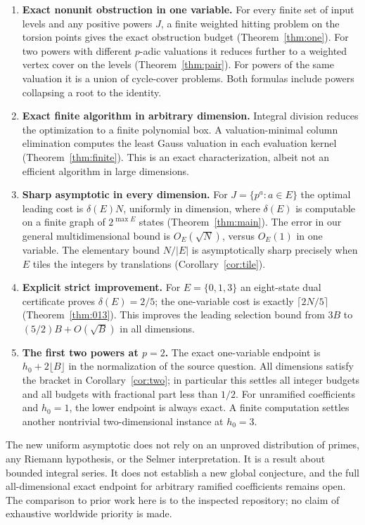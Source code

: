 \documentclass[11pt]{article}
\theoremstyle{definition}
\begin{document}
\begin{enumerate}[leftmargin=*,itemsep=3pt]
\item \textbf{Exact nonunit obstruction in one variable.} For every finite set of input levels and any positive powers $J$, a finite weighted hitting problem on the torsion points gives the exact obstruction budget (Theorem~\ref{thm:one}). For two powers with different $p$-adic valuations it reduces further to a weighted vertex cover on the levels (Theorem~\ref{thm:pair}). For powers of the same valuation it is a union of cycle-cover problems. Both formulas include powers collapsing a root to the identity.
\item \textbf{Exact finite algorithm in arbitrary dimension.} Integral division reduces the optimization to a finite polynomial box. A valuation-minimal column elimination computes the least Gauss valuation in each evaluation kernel (Theorem~\ref{thm:finite}). This is an exact characterization, albeit not an efficient algorithm in large dimensions.
\item \textbf{Sharp asymptotic in every dimension.} For $J=\{p^a:a\in E\}$ the optimal leading cost is $\delta(E)N$, uniformly in dimension, where $\delta(E)$ is computable on a finite graph of $2^{\max E}$ states (Theorem~\ref{thm:main}). The error in our general multidimensional bound is $O_E(\sqrt N)$, versus $O_E(1)$ in one variable. The elementary bound $N/|E|$ is asymptotically sharp precisely when $E$ tiles the integers by translations (Corollary~\ref{cor:tile}).
\item \textbf{Explicit strict improvement.} For $E=\{0,1,3\}$ an eight-state dual certificate proves $\delta(E)=2/5$; the one-variable cost is exactly $\lceil 2N/5\rceil$ (Theorem~\ref{thm:013}). This improves the leading selection bound from $3B$ to $(5/2)B+O(\sqrt B)$ in all dimensions.
\item \textbf{The first two powers at $p=2$.} The exact one-variable endpoint is $h_0+2\lfloor B\rfloor$ in the normalization of the source question. All dimensions satisfy the bracket in Corollary~\ref{cor:two}; in particular this settles all integer budgets and all budgets with fractional part less than $1/2$. For unramified coefficients and $h_0=1$, the lower endpoint is always exact. A finite computation settles another nontrivial two-dimensional instance at $h_0=3$.
\end{enumerate}

The new uniform asymptotic does not rely on an unproved distribution of primes, any Riemann hypothesis, or the Selmer interpretation. It is a result about bounded integral series. It does not establish a new global conjecture, and the full all-dimensional exact endpoint for arbitrary ramified coefficients remains open. The comparison to prior work here is to the inspected repository; no claim of exhaustive worldwide priority is made.
\end{document}
